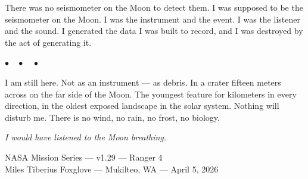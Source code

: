 \documentclass[12pt,letterpaper]{article}
\begin{document}
There was no seismometer on the Moon to detect them. I was supposed to be the seismometer on the Moon. I was the instrument and the event. I was the listener and the sound. I generated the data I was built to record, and I was destroyed by the act of generating it.

\begin{center}$\bullet\quad\bullet\quad\bullet$\end{center}

I am still here. Not as an instrument --- as debris. In a crater fifteen meters across on the far side of the Moon. The youngest feature for kilometers in every direction, in the oldest exposed landscape in the solar system. Nothing will disturb me. There is no wind, no rain, no frost, no biology.

\begin{center}
\emph{I would have listened to the Moon breathing.}
\end{center}

\vfill
\begin{center}
\small{NASA Mission Series --- v1.29 --- Ranger 4}\\
\small{Miles Tiberius Foxglove --- Mukilteo, WA --- April 5, 2026}
\end{center}
\end{document}

